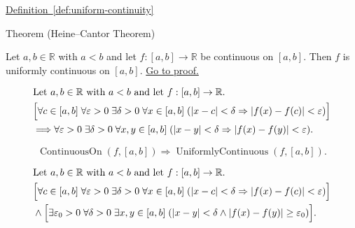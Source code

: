 \begin{dependencies}
\hyperref[def:uniform-continuity]{Definition~\ref*{def:uniform-continuity}}
\end{dependencies}


\begin{theorembox}{Theorem (Heine--Cantor Theorem)}
\begin{theorem}
\label{thm:heine-cantor}
Let $a,b \in \mathbb{R}$ with $a<b$ and let $f:[a,b]\to\mathbb{R}$ be continuous on $[a,b]$. Then $f$ is uniformly continuous on $[a,b]$.
\hyperref[prf:heine-cantor]{Go to proof.}
\end{theorem}
\end{theorembox}

\begin{remark*}
\[
\begin{aligned}
&\text{Let } a,b \in \mathbb{R} \text{ with } a<b \text{ and let } f:[a,b]\to\mathbb{R}.\\
&\Bigl[\forall c \in [a,b]\; \forall \varepsilon>0\; \exists \delta>0\; \forall x \in [a,b]\;(|x-c|<\delta \Rightarrow |f(x)-f(c)|<\varepsilon)\Bigr]\\
&\Longrightarrow \forall \varepsilon>0\; \exists \delta>0\; \forall x,y \in [a,b]\;(|x-y|<\delta \Rightarrow |f(x)-f(y)|<\varepsilon).
\end{aligned}
\]
\end{remark*}

\begin{remark*}
\[
\operatorname{ContinuousOn}(f,[a,b]) \Rightarrow \operatorname{UniformlyContinuous}(f,[a,b]).
\]
\end{remark*}

\begin{remark*}
\[
\begin{aligned}
&\text{Let } a,b \in \mathbb{R} \text{ with } a<b \text{ and let } f:[a,b]\to\mathbb{R}.\\
&\Bigl[\forall c \in [a,b]\; \forall \varepsilon>0\; \exists \delta>0\; \forall x \in [a,b]\;(|x-c|<\delta \Rightarrow |f(x)-f(c)|<\varepsilon)\Bigr]\\
&\land \Bigl[\exists \varepsilon_0>0\; \forall \delta>0\; \exists x,y \in [a,b]\;(|x-y|<\delta \land |f(x)-f(y)| \ge \varepsilon_0)\Bigr].
\end{aligned}
\]
\end{remark*}

